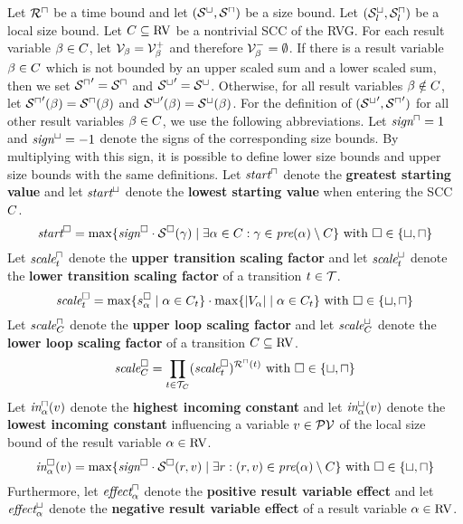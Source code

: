 \begin{theorem}
  Let ${\mathcal{R}^\sqcap}$ be a time bound and let ${({\mathcal{S}^\sqcup}, {\mathcal{S}^\sqcap})}$ be a size bound.
  Let ${({\mathcal{S}^\sqcup_l}, {\mathcal{S}^\sqcap_l})}$ be a local size bound.
  Let $C \subseteq \text{RV}$ be a nontrivial SCC of the RVG.
  For each result variable $\beta \in C$, let $\mathcal{V}_\beta = \mathcal{V}^+_\beta$ and therefore $\mathcal{V}^-_\beta = \emptyset$.
  If there is a result variable $\beta \in C$ which is not bounded by an upper scaled sum and a lower scaled sum, then we set ${\mathcal{S}^\sqcap}' = {\mathcal{S}^\sqcap}$ and ${\mathcal{S}^\sqcup}' = {\mathcal{S}^\sqcup}$.
  Otherwise, for all result variables $\beta \notin C$, let ${\mathcal{S}^\sqcap}'(\beta) = {\mathcal{S}^\sqcap}(\beta)$ and ${\mathcal{S}^\sqcup}'(\beta) = {\mathcal{S}^\sqcup}(\beta)$.
  For the definition of $({\mathcal{S}^\sqcup}', {\mathcal{S}^\sqcap}')$ for all other result variables $\beta \in C$, we use the following abbreviations.
  Let $\emph{sign}^\sqcap = 1$ and $\emph{sign}^\sqcup = -1$ denote the signs of the corresponding size bounds.
  By multiplying with this sign, it is possible to define lower size bounds and upper size bounds with the same definitions.
  Let $\emph{start}^\sqcap$ denote the \textbf{greatest starting value} and let $\emph{start}^\sqcup$ denote the \textbf{lowest starting value} when entering the SCC $C$.
  \[ \emph{start}^\square = \max \lbrace \emph{sign}^\square \cdot {\mathcal{S}^\square}(\gamma) \mid \exists \alpha \in C: \gamma \in \emph{pre}(\alpha) \setminus C \rbrace \text{ with } \square \in \lbrace \sqcup, \sqcap \rbrace \]
  Let $\emph{scale}^\sqcap_t$ denote the \textbf{upper transition scaling factor} and let $\emph{scale}^\sqcup_t$ denote the \textbf{lower transition scaling factor} of a transition $t \in \mathcal{T}$.
  \[ \emph{scale}^\square_t = \max \lbrace s^\square_\alpha \mid \alpha \in C_t \rbrace \cdot \max \lbrace \left|V_\alpha\right| \mid \alpha \in C_t \rbrace \text{ with } \square \in \lbrace \sqcup, \sqcap \rbrace \]
  Let $\emph{scale}^\sqcap_C$ denote the \textbf{upper loop scaling factor} and let $\emph{scale}^\sqcup_C$ denote the \textbf{lower loop scaling factor} of a transition $C \subseteq \text{RV}$.
  \[ \emph{scale}^\square_C = \prod_{t \in \mathcal{T}_C} (\emph{scale}^\square_t)^{{\mathcal{R}^\sqcap}(t)} \text{ with } \square \in \lbrace \sqcup, \sqcap \rbrace \]
  Let $\emph{in}^\sqcap_\alpha(v)$ denote the \textbf{highest incoming constant} and let $\emph{in}^\sqcup_\alpha(v)$ denote the \textbf{lowest incoming constant} influencing a variable $v \in \mathcal{PV}$ of the local size bound of the result variable $\alpha \in \text{RV}$.
  \[ \emph{in}^\square_\alpha(v) = \max \lbrace \emph{sign}^\square \cdot {\mathcal{S}^\square}(r, v) \mid \exists r: (r, v) \in \emph{pre}(\alpha) \setminus C \rbrace \text{ with } \square \in \lbrace \sqcup, \sqcap \rbrace \]
  Furthermore, let $\emph{effect}^\sqcap_\alpha$ denote the \textbf{positive result variable effect} and let $\emph{effect}^\sqcup_\alpha$ denote the \textbf{negative result variable effect} of a result variable $\alpha \in \text{RV}$.

\end{theorem}
